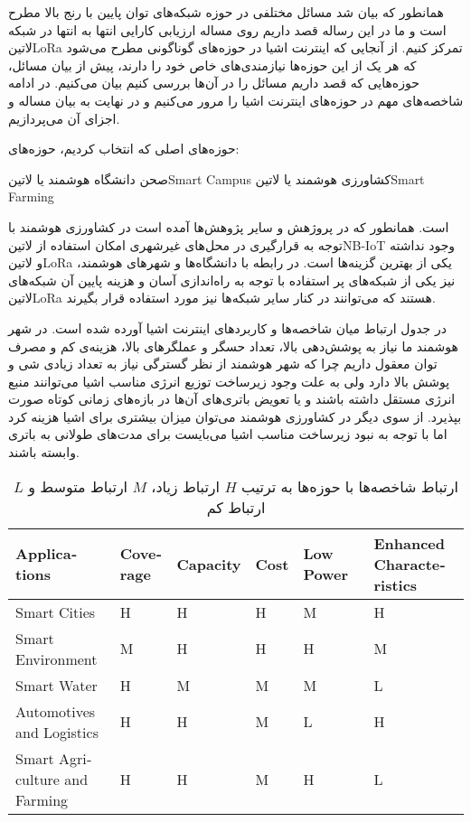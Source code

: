 
همانطور که بیان شد مسائل مختلفی در حوزه شبکه‌های توان پایین با رنج بالا مطرح است و ما در این رساله قصد داریم روی مساله ارزیابی کارایی انتها به انتها
در شبکه ‌لاتین{LoRa} تمرکز کنیم.
از آنجایی که اینترنت اشیا در حوزه‌های گوناگونی مطرح می‌شود که هر یک از این حوزه‌ها نیازمندی‌های خاص خود را دارند، پیش از بیان مسائل، حوزه‌هایی که قصد داریم
مسائل را در آن‌ها بررسی کنیم بیان می‌کنیم. در ادامه شاخصه‌های مهم در حوزه‌های اینترنت اشیا را مرور می‌کنیم و در نهایت به بیان مساله و اجزای آن می‌پردازیم.

حوزه‌های اصلی که انتخاب کردیم، حوزه‌های:

 صحن دانشگاه هوشمند یا ‌لاتین{Smart Campus}
 کشاورزی هوشمند یا ‌لاتین{Smart Farming}

است. همانطور که در پروژهش  و سایر پژوهش‌ها آمده است در کشاورزی هوشمند با توجه به قرارگیری در محل‌های غیرشهری امکان استفاده
از ‌لاتین{NB-IoT} وجود نداشته و ‌لاتین{LoRa} یکی از بهترین گزینه‌ها است.
در رابطه با دانشگاه‌ها و شهرهای هوشمند، نیز یکی از شبکه‌های پر استفاده با توجه به راه‌اندازی آسان و هزینه پایین آن شبکه‌های ‌لاتین{LoRa} هستند
که می‌توانند در کنار سایر شبکه‌ها نیز مورد استفاده قرار بگیرند.

در جدول  ارتباط میان شاخصه‌ها و کاربردهای اینترنت اشیا آورده شده است.
در شهر هوشمند ما نیاز به پوشش‌دهی بالا، تعداد حسگر و عملگرهای بالا، هزینه‌ی کم و مصرف توان معقول داریم چرا
که شهر هوشمند از نظر گسترگی نیاز به تعداد زیادی شی و پوشش بالا دارد ولی به علت وجود زیرساخت توزیع انرژی مناسب
اشیا می‌توانند منبع انرژی مستقل داشته باشند و یا تعویض باتری‌های آن‌ها در بازه‌های زمانی کوتاه صورت بپذیرد.
از سوی دیگر در کشاورزی هوشمند می‌توان میزان بیشتری برای اشیا هزینه کرد اما با توجه به نبود زیرساخت مناسب
اشیا می‌بایست برای مدت‌های طولانی به باتری وابسته باشند.

\begin{table}
\caption{ارتباط شاخصه‌ها با حوزه‌ها به ترتیب $H$ ارتباط زیاد، $M$ ارتباط متوسط و $L$ ارتباط کم }
\label{جدول: شاخصه‌ها و کاربردها}
\begin{latin}\begin{tabularx}
  {\textwidth}
  {|*{6}{X|}}
  \toprule
  Applications &
  Coverage &
  Capacity &
  Cost &
  Low Power &
  Enhanced Characteristics \\
  \midrule
  Smart Cities &
  H &
  H &
  H &
  M &
  H \\
  \midrule
  Smart Environment &
  M &
  H &
  H &
  H &
  M \\
  \midrule
  Smart Water &
  H &
  M &
  M &
  M &
  L \\
  \midrule
  Automotives and Logistics &
  H &
  H &
  M &
  L &
  H \\
  \midrule
  Smart Agriculture and Farming &
  H &
  H &
  M &
  H &
  L \\
  \bottomrule
\end{tabularx}\end{latin}
\end{table}


